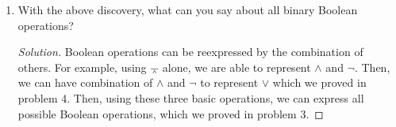 \documentclass[12pt]{article}
\renewcommand\qedsymbol{$\blacksquare$}
\newenvironment{solution}
{\begin{proof}[Solution]\renewcommand\qedsymbol{$\square$}}
	{\end{proof}}
\begin{document}
\begin{enumerate}
\begin{enumerate}
\begin{proof}
	
\begin{displaymath}
	\begin{array}{c|c|c}
		x &  x \barwedge x&\lnot x\\
		\hline  
		T & F&F\\
		F & T&T\\ 
	\end{array}	
\end{displaymath}
	Since the truth values are not identical in the last two column, we can conclude that $\lnot x$ is equivalent to $x \barwedge x$. Hence,  $\lnot x$  can be reexpressed only using $\barwedge$. Noticing that $x \land y$ has the exact opposite truth value of all pairs of inputs compared with $x \barwedge y$. Therefore, we can reexpress $x \land y$ as $\lnot (x \barwedge y)$. From the conclusion above, we know that it is equivalent to $(x \barwedge y) \barwedge (x \barwedge y)$.
	\begin{displaymath}
		\begin{array}{c|c|c|c|c|c}
			x & y &x \land y & x \barwedge y& \lnot ( x \barwedge y) &(x \barwedge y) \barwedge (x \barwedge y)\\
			\hline  
			T & T &T&F & T&T\\
			T & F &F&T&F&F\\ 
			F & T &F&T&F&F\\
			F & F &F&T&F&F\\
		\end{array}	
	\end{displaymath}
 	Hence,  $x \land y$  can be reexpressed only using $\barwedge$ as well.
		\end{proof}
		\item With the above discovery, what can you say about all binary Boolean operations?
		\begin{solution}
			Boolean operations can be reexpressed by the combination of others. For example, using $\barwedge$ alone, we are able to represent $\land$ and $\lnot$. Then, we can have combination of $\land$ and $\lnot$ to represent $\lor$ which we proved in problem 4. Then, using these three basic operations, we can express all possible Boolean operations, which we proved in problem 3.
		
 	\end{solution}
	\end{enumerate}
\end{enumerate}
\end{document}
